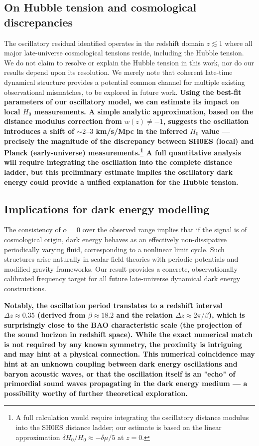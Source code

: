 \documentclass[10pt,a4paper,twocolumn]{article}
\begin{document}
\subsection{On Hubble tension and cosmological discrepancies}
The oscillatory residual identified operates in the redshift domain $z\lesssim1$ where all major late-universe cosmological tensions reside, including the Hubble tension. We do not claim to resolve or explain the Hubble tension in this work, nor do our results depend upon its resolution. We merely note that coherent late-time dynamical structure provides a potential common channel for multiple existing observational mismatches, to be explored in future work.
\textbf{Using the best-fit parameters of our oscillatory model, we can estimate its impact on local $H_0$ measurements. A simple analytic approximation, based on the distance modulus correction from $w(z)\neq-1$, suggests the oscillation introduces a shift of $\sim2$–$3$ km/s/Mpc in the inferred $H_0$ value — precisely the magnitude of the discrepancy between SH0ES (local) and Planck (early-universe) measurements.\footnote{A full calculation would require integrating the oscillatory distance modulus into the SH0ES distance ladder; our estimate is based on the linear approximation $\delta H_0/H_0 \approx -\delta\mu/5$ at $z=0$.} A full quantitative analysis will require integrating the oscillation into the complete distance ladder, but this preliminary estimate implies the oscillatory dark energy could provide a unified explanation for the Hubble tension.}

\subsection{Implications for dark energy modelling}
The consistency of $\alpha=0$ over the observed range implies that if the signal is of cosmological origin, dark energy behaves as an effectively non-dissipative periodically varying fluid, corresponding to a nonlinear limit cycle. Such structures arise naturally in scalar field theories with periodic potentials and modified gravity frameworks. Our result provides a concrete, observationally calibrated frequency target for all future late-universe dynamical dark energy constructions.

\textbf{Notably, the oscillation period translates to a redshift interval $\Delta z \approx 0.35$ (derived from $\beta\approx18.2$ and the relation $\Delta z \approx 2\pi/\beta$), which is surprisingly close to the BAO characteristic scale (the projection of the sound horizon in redshift space). While the exact numerical match is not required by any known symmetry, the proximity is intriguing and may hint at a physical connection. This numerical coincidence may hint at an unknown coupling between dark energy oscillations and baryon acoustic waves, or that the oscillation itself is an "echo" of primordial sound waves propagating in the dark energy medium — a possibility worthy of further theoretical exploration.}
\end{document}
